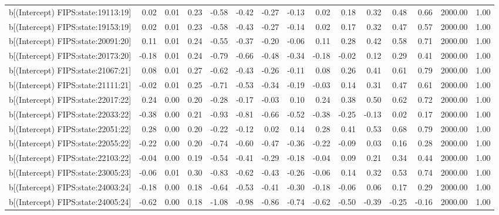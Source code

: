 \begin{table}[ht]
\begin{tabular}{rrrrrrrrrrrrrrr}
  b[(Intercept) FIPS:state:19113:19] & 0.02 & 0.01 & 0.23 & -0.58 & -0.42 & -0.27 & -0.13 & 0.02 & 0.18 & 0.32 & 0.48 & 0.66 & 2000.00 & 1.00 \\ 
  b[(Intercept) FIPS:state:19153:19] & 0.02 & 0.01 & 0.23 & -0.58 & -0.43 & -0.27 & -0.14 & 0.02 & 0.17 & 0.32 & 0.47 & 0.57 & 2000.00 & 1.00 \\ 
  b[(Intercept) FIPS:state:20091:20] & 0.11 & 0.01 & 0.24 & -0.55 & -0.37 & -0.20 & -0.06 & 0.11 & 0.28 & 0.42 & 0.58 & 0.71 & 2000.00 & 1.00 \\ 
  b[(Intercept) FIPS:state:20173:20] & -0.18 & 0.01 & 0.24 & -0.79 & -0.66 & -0.48 & -0.34 & -0.18 & -0.02 & 0.12 & 0.29 & 0.41 & 2000.00 & 1.00 \\ 
  b[(Intercept) FIPS:state:21067:21] & 0.08 & 0.01 & 0.27 & -0.62 & -0.43 & -0.26 & -0.11 & 0.08 & 0.26 & 0.41 & 0.61 & 0.79 & 2000.00 & 1.00 \\ 
  b[(Intercept) FIPS:state:21111:21] & -0.02 & 0.01 & 0.25 & -0.71 & -0.53 & -0.34 & -0.19 & -0.03 & 0.14 & 0.31 & 0.47 & 0.61 & 2000.00 & 1.00 \\ 
  b[(Intercept) FIPS:state:22017:22] & 0.24 & 0.00 & 0.20 & -0.28 & -0.17 & -0.03 & 0.10 & 0.24 & 0.38 & 0.50 & 0.62 & 0.72 & 2000.00 & 1.00 \\ 
  b[(Intercept) FIPS:state:22033:22] & -0.38 & 0.00 & 0.21 & -0.93 & -0.81 & -0.66 & -0.52 & -0.38 & -0.25 & -0.13 & 0.02 & 0.17 & 2000.00 & 1.00 \\ 
  b[(Intercept) FIPS:state:22051:22] & 0.28 & 0.00 & 0.20 & -0.22 & -0.12 & 0.02 & 0.14 & 0.28 & 0.41 & 0.53 & 0.68 & 0.79 & 2000.00 & 1.00 \\ 
  b[(Intercept) FIPS:state:22055:22] & -0.22 & 0.00 & 0.20 & -0.74 & -0.60 & -0.47 & -0.36 & -0.22 & -0.09 & 0.03 & 0.16 & 0.28 & 2000.00 & 1.00 \\ 
  b[(Intercept) FIPS:state:22103:22] & -0.04 & 0.00 & 0.19 & -0.54 & -0.41 & -0.29 & -0.18 & -0.04 & 0.09 & 0.21 & 0.34 & 0.44 & 2000.00 & 1.00 \\ 
  b[(Intercept) FIPS:state:23005:23] & -0.06 & 0.01 & 0.30 & -0.83 & -0.62 & -0.43 & -0.26 & -0.06 & 0.14 & 0.32 & 0.53 & 0.74 & 2000.00 & 1.00 \\ 
  b[(Intercept) FIPS:state:24003:24] & -0.18 & 0.00 & 0.18 & -0.64 & -0.53 & -0.41 & -0.30 & -0.18 & -0.06 & 0.06 & 0.17 & 0.29 & 2000.00 & 1.00 \\ 
  b[(Intercept) FIPS:state:24005:24] & -0.62 & 0.00 & 0.18 & -1.08 & -0.98 & -0.86 & -0.74 & -0.62 & -0.50 & -0.39 & -0.25 & -0.16 & 2000.00 & 1.00 \\ 

\end{tabular}
\end{table}
